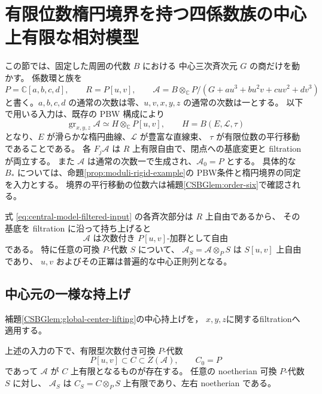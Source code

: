 \section{有限位数楕円境界を持つ四係数族の中心上有限な相対模型}
\label{sec:four-parameter-central-model}

この節では、固定した周囲の代数 $B$ における
中心三次斉次元 $G$ の商だけを動かす。
係数環と族を
\[
 P=\mathbb C[a,b,c,d],\qquad
 R=P[u,v],\qquad
 \mathcal A=B\otimes_{\mathbb C}P/
 (G+au^3+bu^2v+cuv^2+dv^3)
\]
と書く。$a,b,c,d$ の通常の次数は零、$u,v,x,y,z$ の通常の次数は一とする。
以下で用いる入力は、既存の PBW 構成により
\begin{equation}\label{eq:central-model-filtered-input}
 \operatorname{gr}_{x,y,z}\mathcal A
 \simeq H\otimes_{\mathbb C}P[u,v],\qquad
 H=B(E,\mathcal L,\tau)
\end{equation}
となり、$E$ が滑らかな楕円曲線、$\mathcal L$ が豊富な直線束、
$\tau$ が有限位数の平行移動であることである。
各 $F_j\mathcal A$ は $R$ 上有限自由で、閉点への基底変更と filtration が両立する。
また $\mathcal A$ は通常の次数一で生成され、$\mathcal A_0=P$ とする。
具体的な $B_*$ については、命題\ref{prop:moduli-rigid-example}の
PBW条件と楕円境界の同定を入力とする。
境界の平行移動の位数六は補題\ref{CSBGlem:order-six}で確認される。

式 \eqref{eq:central-model-filtered-input} の各斉次部分は $R$ 上自由であるから、
その基底を filtration に沿って持ち上げると
\begin{equation}\label{eq:central-model-R-free}
 \mathcal A\text{ は次数付き }P[u,v]\text{-加群として自由}
\end{equation}
である。
特に任意の可換 $P$-代数 $S$ について、
$\mathcal A_S=\mathcal A\otimes_P S$ は $S[u,v]$ 上自由であり、
$u,v$ およびその正冪は普遍的な中心正則列となる。

\subsection{中心元の一様な持上げ}

補題\ref{CSBGlem:global-center-lifting}の中心持上げを，
$x,y,z$に関するfiltrationへ適用する。

\begin{theorem}[全四係数族の有限な中心模型]
\label{thm:central-model-finite}
上述の入力の下で、有限型次数付き可換 $P$-代数
\[
 P[u,v]\subset C\subset Z(\mathcal A),\qquad C_0=P
\]
であって $\mathcal A$ が $C$ 上有限となるものが存在する。
任意の noetherian 可換 $P$-代数 $S$ に対し、
$\mathcal A_S$ は $C_S=C\otimes_P S$ 上有限であり、左右 noetherian である。
\end{theorem}

